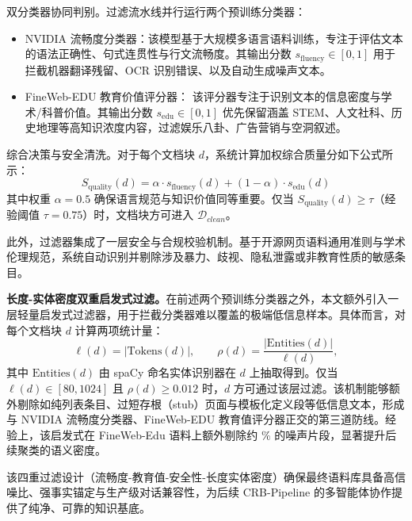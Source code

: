 双分类器协同判别。过滤流水线并行运行两个预训练分类器：

\begin{itemize}

    \item NVIDIA 流畅度分类器：该模型基于大规模多语言语料训练，专注于评估文本的语法正确性、句式连贯性与行文流畅度。其输出分数 $s_{\text{fluency}} \in [0,1]$ 用于拦截机器翻译残留、OCR 识别错误、以及自动生成噪声文本。

    \item FineWeb-EDU 教育价值评分器： 该评分器专注于识别文本的信息密度与学术/科普价值。其输出分数 $s_{\text{edu}} \in [0,1]$ 优先保留涵盖 STEM、人文社科、历史地理等高知识浓度内容，过滤娱乐八卦、广告营销与空洞叙述。

\end{itemize}



综合决策与安全清洗。对于每个文档块 $d$，系统计算加权综合质量分如下公式所示：
\begin{equation}
    S_{\text{quality}}(d) = \alpha \cdot s_{\text{fluency}}(d) + (1-\alpha) \cdot s_{\text{edu}}(d)
\end{equation}
其中权重 $\alpha=0.5$ 确保语言规范与知识价值同等重要。仅当 $S_{\text{quality}}(d) \geq \tau$（经验阈值 $\tau=0.75$）时，文档块方可进入 $\mathcal{D}_{clean}$。



此外，过滤器集成了一层安全与合规校验机制。基于开源网页语料通用准则与学术伦理规范，系统自动识别并剔除涉及暴力、歧视、隐私泄露或非教育性质的敏感条目。

\textbf{长度-实体密度双重启发式过滤。}在前述两个预训练分类器之外，本文额外引入一层轻量启发式过滤器，用于拦截分类器难以覆盖的极端低信息样本。具体而言，对每个文档块 $d$ 计算两项统计量：
\begin{equation}
    \ell(d) = |\text{Tokens}(d)|, \qquad \rho(d) = \frac{|\text{Entities}(d)|}{\ell(d)},
\end{equation}
其中 $\text{Entities}(d)$ 由 spaCy 命名实体识别器在 $d$ 上抽取得到。仅当 $\ell(d) \in [80, 1024]$ 且 $\rho(d) \geq 0.012$ 时，$d$ 方可通过该层过滤。该机制能够额外剔除如纯列表条目、过短存根（stub）页面与模板化定义段等低信息文本，形成与 NVIDIA 流畅度分类器、FineWeb-EDU 教育值评分器正交的第三道防线。经验上，该启发式在 FineWeb-Edu 语料上额外剔除约 \% 的噪声片段，显著提升后续聚类的语义密度。

该四重过滤设计（流畅度-教育值-安全性-长度实体密度）确保最终语料库具备高信噪比、强事实锚定与生产级对话兼容性，为后续 CRB-Pipeline 的多智能体协作提供了纯净、可靠的知识基底。







